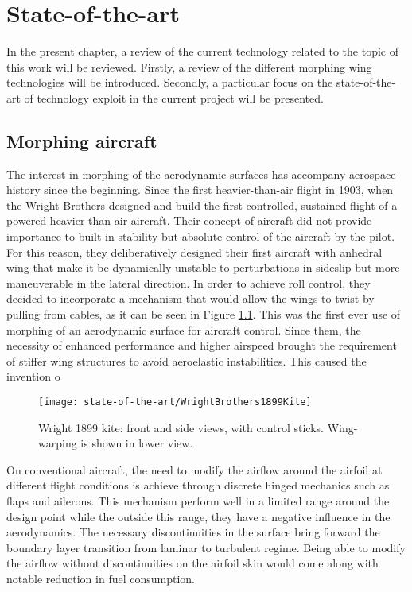 \chapter{State-of-the-art} \label{chap:State_of_the_art}

In the present chapter, a review of the current technology related to the topic of this work will be reviewed. Firstly, a review of the different morphing wing technologies will be introduced. Secondly, a particular focus on the state-of-the-art of technology exploit in the current project will be presented.

\section{Morphing aircraft} \label{sec:Morphing_state}

The interest in morphing of the aerodynamic surfaces has accompany aerospace history since the beginning. Since the first heavier-than-air flight in 1903, when the Wright Brothers designed and build the first controlled, sustained flight of a powered heavier-than-air aircraft. Their concept of aircraft did not provide importance to built-in stability but absolute control of the aircraft by the pilot. For this reason, they deliberatively designed their first aircraft with anhedral wing that make it be dynamically unstable to perturbations in sideslip but more maneuverable in the lateral direction. In order to achieve roll control, they decided to incorporate a mechanism that would allow the wings to twist by pulling from cables, as it can be seen in Figure \ref{fig:Wright}. This was the first ever use of morphing of an aerodynamic surface for aircraft control. Since them, the necessity of enhanced performance and higher airspeed brought the requirement of stiffer wing structures to avoid aeroelastic instabilities. This caused the invention o

\begin{figure}[!htpb]
  \centering
  \texttt{[image: state-of-the-art/WrightBrothers1899Kite]}
  \caption[Wright Brothers 1899 kite]{Wright 1899 kite: front and side views, with control sticks. Wing-warping is shown in lower view. \cite{Wright}}\label{fig:Wright}
\end{figure}

On conventional aircraft, the need to modify the airflow around the airfoil at different flight conditions is achieve through discrete hinged mechanics such as flaps and ailerons. This mechanism perform well in a limited range around the design point while the outside this range, they have a negative influence in the aerodynamics. The necessary discontinuities in the surface bring forward the boundary layer transition from laminar to turbulent regime. Being able to modify the airflow without discontinuities on the airfoil skin would come along with notable reduction in fuel consumption.

